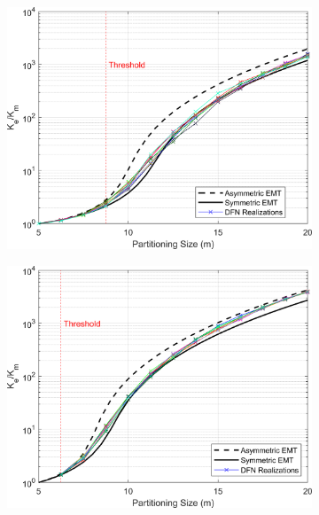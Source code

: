 \documentclass[main.tex]{subfiles}
\begin{document}
\begin{figure}[ht]
    \centering
    \begin{subfigure}{0.3\textwidth}
        \includegraphics[width=\textwidth]{FSU/Plot_FSU_Case_01_nohead.png}
        \label{fig:FSU_A}
    \end{subfigure}
    \begin{subfigure}{0.3\textwidth}
        \includegraphics[width=\textwidth]{FSU/Plot_FSU_Case_03_nohead.png}
        \label{fig:FSU_B}
    \end{subfigure}

\end{figure}
\end{document}
